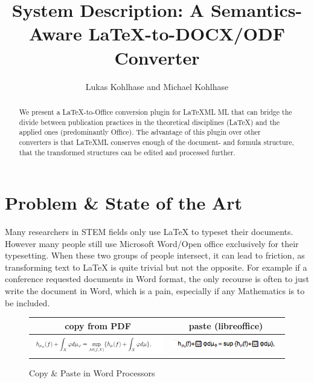 \documentclass{llncs}
\title{System Description: A Semantics-Aware {\LaTeX}-to-DOCX/ODF Converter}
\author{Lukas Kohlhase and Michael Kohlhase}
\institute{Mathematics/Computer Science\\
  Jacobs University Bremen}
\def\latexml{{\LaTeX}ML\xspace}
\begin{document}
\maketitle
\begin{abstract}
  We present a {\LaTeX}-to-Office conversion plugin for \latexml ML that can bridge the
  divide between publication practices in the theoretical disciplines (\LaTeX) and the
  applied ones (predominantly Office). The advantage of this plugin over other converters
  is that \latexml conserves enough of the document- and formula structure, that the
  transformed structures can be edited and processed further.
\end{abstract}

\section{Problem \& State of the Art}\label{sec:intro}

Many researchers in STEM fields only use {\LaTeX} to typeset their documents. However many
people still use Microsoft Word/Open office exclusively for their typesetting. When these
two groups of people intersect, it can lead to friction, as transforming text to {\LaTeX}
is quite trivial but not the opposite. For example if a conference requested documents in
Word format, the only recourse is often to just write the document in Word, which is a
pain, especially if any Mathematics is to be included.


\begin{figure}[ht]
  \begin{tabular}{|c|c|}\hline%
    copy from PDF & paste (libreoffice)\\\hline
    \includegraphics[width=6cm]{mathsnippet} & 
    \includegraphics[width=5cm]{mathsnippet-libreoffice}\\\hline
  \end{tabular}
\caption{Copy \& Paste in Word Processors}\label{fig:cnp}
\end{figure}
\end{document}
